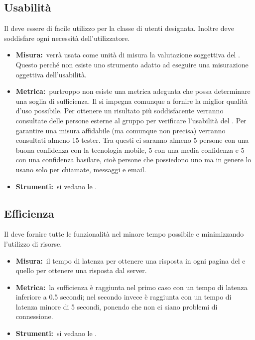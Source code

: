 	\subsection{Usabilità}
		Il  deve essere di facile utilizzo per la classe di utenti designata. Inoltre deve soddisfare ogni necessità dell'utilizzatore.
		\begin{itemize}
			\item \textbf{Misura:}\ verrà usata come unità di misura la valutazione soggettiva del . Questo perché non esiste uno strumento adatto ad eseguire una misurazione oggettiva dell'usabilità.
			\item \textbf{Metrica:}\ purtroppo non esiste una metrica adeguata che possa determinare una soglia di sufficienza. Il  si impegna comunque a fornire la miglior qualità d'uso possibile. Per ottenere un risultato più soddisfacente verranno consultate delle persone esterne al gruppo per verificare l'usabilità del . Per garantire una misura affidabile (ma comunque non precisa) verranno consultati almeno 15 tester. Tra questi ci saranno almeno 5 persone con una buona confidenza con la tecnologia mobile, 5 con una media confidenza e 5 con una confidenza basilare, cioè persone che possiedono uno  ma in genere lo usano solo per chiamate, messaggi e email.
			\item \textbf{Strumenti:}\ si vedano le \NPdoc.
		\end{itemize}
	\subsection{Efficienza}
		Il  deve fornire tutte le funzionalità nel minore tempo possibile e minimizzando l'utilizzo di risorse.
		\begin{itemize}
			\item \textbf{Misura:}\ il tempo di latenza per ottenere una risposta in ogni pagina del  e quello per ottenere una risposta dal server.
			\item \textbf{Metrica:}\ la sufficienza è raggiunta nel primo caso con un tempo di latenza inferiore a 0.5 secondi; nel secondo invece è raggiunta con un tempo di latenza minore di 5 secondi, ponendo che non ci siano problemi di connessione.
			\item \textbf{Strumenti:}\ si vedano le \NPdoc.
		\end{itemize}
